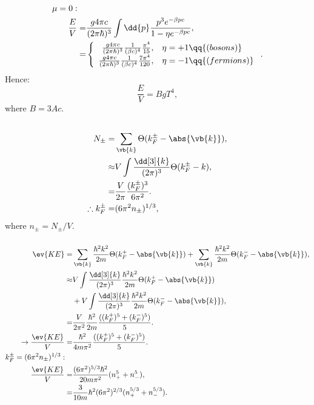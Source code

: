 \documentclass[a4paper,12pt,twoside]{article}
\begin{document}
\begin{multicols*}{2}
\begin{align}
	\mu = 0:\quad&\\
	\frac{E}{V} =& \frac{g4\pi c}{(2\pi\hbar)^3} \int \dd{p}\frac{p^3 e^{-\beta pc}}{1-\eta e^{-\beta pc}},\\
	=& \left\{
		\begin{array}{rl}
			\frac{g4\pi c}{(2\pi\hbar)^3} \frac{1}{(\beta c)^4} \frac{\pi^4}{15}, & \eta = +1\qq{(bosons)}\\
			\frac{g4\pi c}{(2\pi\hbar)^3} \frac{1}{(\beta c)^4} \frac{7\pi^4}{120}, & \eta = -1 \qq{(fermions)}
		\end{array}
	\right..
\end{align}
Hence:
\begin{equation}
	\frac{E}{V} = B g T^4,
\end{equation}
where $B = 3Ac$.

\subsection{}
\subsubsection{}
\begin{align}
	N_{\pm} =& \sum_{\vb{k}} \Theta(k_F^{\pm} - \abs{\vb{k}}),\\
	\approx& V\int \frac{\dd[3]{k}}{(2\pi)^3} \Theta(k_F^{\pm} - k),\\
	=& \frac{V}{2\pi} \frac{(k_F^\pm)^3}{6\pi^2}.\\
	\therefore k_F^\pm =& (6\pi^2 n_\pm)^{1/3},
\end{align}
where $n_\pm = N_\pm/V$.
\subsubsection{}
\begin{align}
	\ev{KE} =& \sum_{\vb{k}} \frac{\hbar^2 k^2}{2m} \Theta(k_F^+ - \abs{\vb{k}})
	+ \sum_{\vb{k}} \frac{\hbar^2 k^2}{2m} \Theta(k_F^- - \abs{\vb{k}}),\\
	\approx& V\int \frac{\dd[3]{k}}{(2\pi)^3} \frac{\hbar^2 k^2}{2m} \Theta(k_F^+ - \abs{\vb{k}})\nonumber\\
	&+ V\int \frac{\dd[3]{k}}{(2\pi)^3} \frac{\hbar^2 k^2}{2m} \Theta(k_F^- - \abs{\vb{k}}),\\
	=& \frac{V}{2\pi^2} \frac{\hbar^2}{2m} \frac{((k_F^+)^5+(k_F^-)^5)}{5}.\\
	\rightarrow \frac{\ev{KE}}{V} =& \frac{\hbar^2}{4m\pi^2} \frac{((k_F^+)^5+(k_F^-)^5)}{5}.\\
	k_F^{\pm} = (6\pi^2n_{\pm})^{1/3}:\quad&\\
	\frac{\ev{KE}}{V} =& \frac{(6\pi^2)^{5/3}\hbar^2}{20m\pi^2} (n_+^5+n_-^5),\\
	=& \frac{3}{10m} \hbar^2 (6\pi^2)^{2/3} (n_+^{5/3}+n_-^{5/3}).
\end{align}

\end{multicols*}
\end{document}
